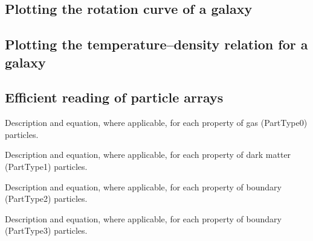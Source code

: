 \documentclass[10pt, a4paper]{article}
\begin{document}
\subsection{Plotting the rotation curve of a galaxy}

\subsection{Plotting the temperature--density relation for a galaxy}

\subsection{Efficient reading of particle arrays}

\newpage

\begin{table}
\label{TabGas}
\caption{Description and equation, where applicable, for each property of gas (PartType0) particles.}
\begin{center}
\footnotesize
\renewcommand{\arraystretch}{1.5}

\end{center}
\end{table}

\begin{table}
\label{TabDM}
\caption{Description and equation, where applicable, for each property of dark matter (PartType1) particles.}
\begin{center}
\footnotesize
\renewcommand{\arraystretch}{1.5}

\end{center}
\end{table}

\begin{table}
\label{TabBoundary2}
\caption{Description and equation, where applicable, for each property of boundary (PartType2) particles.}
\begin{center}
\footnotesize
\renewcommand{\arraystretch}{1.5}

\end{center}
\end{table}

\begin{table}
\label{TabBoundary3}
\caption{Description and equation, where applicable, for each property of boundary (PartType3) particles.}
\begin{center}
\footnotesize
\renewcommand{\arraystretch}{1.5}

\end{center}
\end{table}
\end{document}
